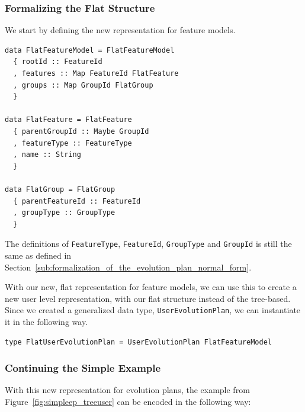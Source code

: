 \documentclass[a4paper,english]{ifimaster}
\begin{document}
\subsubsection{Formalizing the Flat Structure}%
\label{ssub:formalizing_the_flat_structure}

We start by defining the new representation for feature models.

\begin{verbatim}
data FlatFeatureModel = FlatFeatureModel
  { rootId :: FeatureId
  , features :: Map FeatureId FlatFeature
  , groups :: Map GroupId FlatGroup
  }

data FlatFeature = FlatFeature
  { parentGroupId :: Maybe GroupId
  , featureType :: FeatureType
  , name :: String
  }

data FlatGroup = FlatGroup
  { parentFeatureId :: FeatureId
  , groupType :: GroupType
  }
\end{verbatim}

The definitions of \texttt{FeatureType}, \texttt{FeatureId}, \texttt{GroupType} and \texttt{GroupId} is still the same as defined in Section~\vref{sub:formalization_of_the_evolution_plan_normal_form}.

With our new, flat representation for feature models, we can use this to create a new user level representation, with our flat structure instead of the tree-based. Since we created a generalized data type, \texttt{User\-Evolution\-Plan}, we can instantiate it in the following way.

\begin{verbatim}
type FlatUserEvolutionPlan = UserEvolutionPlan FlatFeatureModel
\end{verbatim}

\subsubsection{Continuing the Simple Example}%
\label{ssub:continuing_the_simple_example}

With this new representation for evolution plans, the example from Figure~\vref{fig:simpleep_treeuser} can be encoded in the following way:
\end{document}
